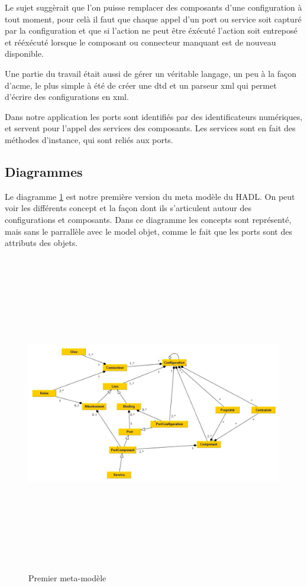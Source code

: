 \documentclass[11pt,a4paper]{article}
\begin{document}
Le sujet suggèrait que l'on puisse remplacer des composants d'une configuration à tout moment, pour celà il faut que chaque appel d'un port ou service soit capturé par la configuration et que si l'action ne peut être éxécuté l'action soit entreposé et rééxécuté lorsque le composant ou connecteur manquant est de nouveau disponible.

Une partie du travail était aussi de gérer un véritable langage, un peu à la façon d'acme, le plus simple à été de créer une dtd et un parseur xml qui permet d'écrire des configurations en xml. 

Dans notre application les ports sont identifiés par des identificateurs numériques, et servent pour l'appel des services des composants. Les services sont en fait des méthodes d'instance, qui sont reliés aux ports.

\subsection{Diagrammes}

Le diagramme \ref{Premier meta-modèle} est notre première version du meta modèle du HADL. On peut voir les différents concept et la façon dont ils s'articulent autour des configurations et composants. Dans ce diagramme les concepts sont représenté, mais sans le parrallèle avec le model objet, comme le fait que les ports sont des attributs des objets.

\begin{figure}[h]
  		\centering
  		\includegraphics[height=14cm,width=15cm]{M2.jpg}
  		\caption{Premier meta-modèle}
  		\label{Premier meta-modèle}
\end{figure}
\end{document}
